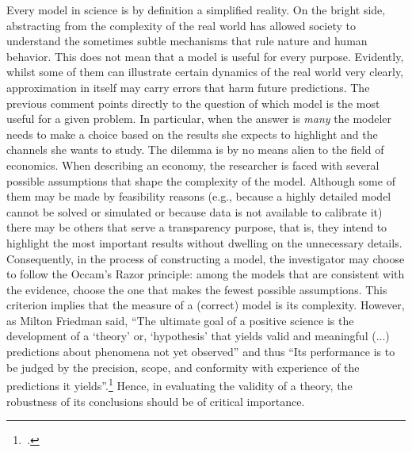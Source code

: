 \documentclass[english, a4paper, 12pt]{article}
\begin{document}
Every model in science is by definition a simplified reality. On the bright side, abstracting from the complexity of the real world has allowed society to understand the sometimes subtle mechanisms that rule nature and human behavior. This does not mean that a model is useful for every purpose. Evidently, whilst some of them can illustrate certain dynamics of the real world very clearly, approximation in itself may carry errors that harm future predictions. The previous comment points directly to the question of which model is the most useful for a given problem. In particular, when the answer is \textit{many} the modeler needs to make a choice based on the results she expects to highlight and the channels she wants to study. The dilemma is by no means alien to the field of economics. When describing an economy, the researcher is faced with several possible assumptions that shape the complexity of the model. Although some of them may be made by feasibility reasons (e.g., because a highly detailed model cannot be solved or simulated or because data is not available to calibrate it) there may be others that serve a transparency purpose, that is, they intend to highlight the most important results without dwelling on the unnecessary details. Consequently, in the process of constructing a model, the investigator may choose to follow the Occam's Razor principle: among the models that are consistent with the evidence, choose the one that makes the fewest possible assumptions. This criterion implies that the measure of a (correct) model is its complexity. However, as Milton Friedman said, ``The ultimate goal of a positive science is the development of a `theory' or, `hypothesis' that yields valid and meaningful (...) predictions about phenomena not yet observed'' and thus ``Its performance is to be judged by the precision, scope, and conformity with experience of the predictions it yields''.\footnote{\,\cite{FriedmanPositive}.} Hence, in evaluating the validity of a theory, the robustness of its conclusions should be of critical importance.
\end{document}

